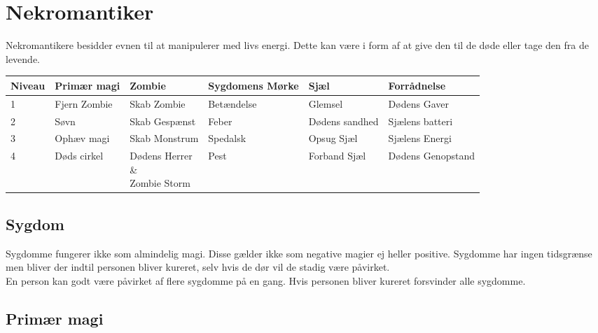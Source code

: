 \chapter{Nekromantiker}
Nekromantikere besidder evnen til at manipulerer med livs energi. Dette kan være i form af at give den til de døde eller tage den fra de levende.

\begin{table}[H]
    \centering
    \begin{tabular}{|p{}|p{}|p{}|p{}|p{}|p{}|}
    \rowcolor{cerulean!80}\hline
        Niveau & Primær magi & Zombie & Sygdomens Mørke  & Sjæl & Forrådnelse \\\hline
        
        1 & 
        Fjern Zombie & 
        Skab Zombie & 
        Betændelse & 
        Glemsel& 
        Dødens Gaver\\\hline
        
        2 & 
        Søvn & 
        Skab Gespænst & 
        Feber & 
        Dødens sandhed& 
        Sjælens batteri\\\hline
        
        3 & 
        Ophæv magi & 
        Skab Monstrum & 
        Spedalsk & 
        Opsug Sjæl& 
        Sjælens Energi\\\hline
        
        4 & 
        Døds cirkel & 
        \small\makecell{Dødens Herrer \\\&\\ Zombie Storm}& 
        Pest & 
        Forband Sjæl& 
        Dødens Genopstand 
        \\\hline
    \end{tabular}
\end{table}

\section{Sygdom}
Sygdomme fungerer ikke som almindelig magi. Disse gælder ikke som negative magier ej heller positive. Sygdomme har ingen tidsgrænse men bliver der indtil personen bliver kureret, selv hvis de dør vil de stadig være påvirket.\\
En person kan godt være påvirket af flere sygdomme på en gang. Hvis personen bliver kureret forsvinder alle sygdomme.

\section{Primær magi}

